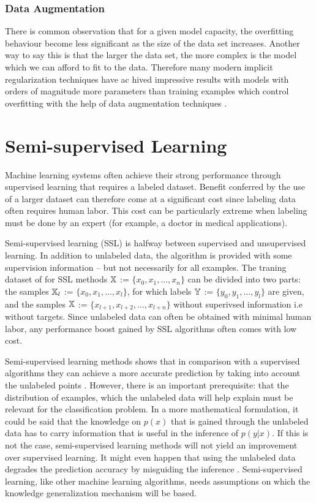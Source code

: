 \documentclass[12pt]{article}
\theoremstyle{definition}
\DeclareRobustCommand{\[}{\begin{equation}}
\DeclareRobustCommand{\]}{\end{equation}}
\begin{document}
        \subsubsection{Data Augmentation}
            There is common observation that for a given model capacity,
            the overfitting behaviour become less significant as the size of the data set increases.
            Another way to say this is that the larger the data set, the more complex is the model which we can afford to fit to the data.
            Therefore many modern implicit regularization techniques have ac hived impressive results with models with orders of magnitude more parameters than training examples which control overfitting with the help of data augmentation techniques \cite{DataAugmentation}.
            
\section{Semi-supervised Learning}
Machine learning systems often achieve their strong performance through supervised learning that requires a labeled dataset. 
Benefit conferred by the use of a larger dataset can therefore come at a significant cost since labeling data often requires
human labor. This cost can be particularly extreme when labeling must be done by an expert (for example, a doctor in medical applications).

Semi-supervised learning (SSL) is halfway between supervised and unsupervised
learning. In addition to unlabeled data, the algorithm is provided with some supervision
information – but not necessarily for all examples. The traning dataset of 
for SSL methods $\displaystyle {\mathbb{X}}$ := $\displaystyle \{x_0, x_1, \dots, x_n \}$  can be divided into two parts: the samples $\displaystyle {\mathbb{X}}_l$ := $\displaystyle \{x_0, x_1, \dots, x_l \}$, for
which labels $\displaystyle {\mathbb{Y}}$ := $\displaystyle \{y_0, y_1, \dots, y_l \}$ are given, and the samples $\displaystyle {\mathbb{X}}$ := $\displaystyle \{x_{l+1}, x_{l+2}, \dots, x_{l+n}\}$
without superivsed information i.e without targets. Since unlabeled data can often be obtained with minimal human labor, any performance boost gained by SSL algorithms often comes with low cost.

Semi-supervised learning methods shows that
in comparison with a supervised algorithms they can achieve a more accurate prediction by taking into account the unlabeled
points \cite{UDA}.  However, there is an important prerequisite: that the
distribution of examples, which the unlabeled data will help explain must be relevant
for the classification problem.
In a more mathematical formulation, it could be said that the knowledge on $p(x)$
that is gained through the unlabeled data has to carry information that is useful
in the inference of $p(y|x)$. If this is not the case, semi-supervised learning methods will not
yield an improvement over supervised learning. It might even happen that using
the unlabeled data degrades the prediction accuracy by misguiding the inference \cite{Semi-Supervised-Book}.
Semi-supervised learning, like other machine learning algorithms, needs assumptions on which the knowledge generalization mechanism will be based. \cite{Semi-Supervised-Book}
 
\end{document}
